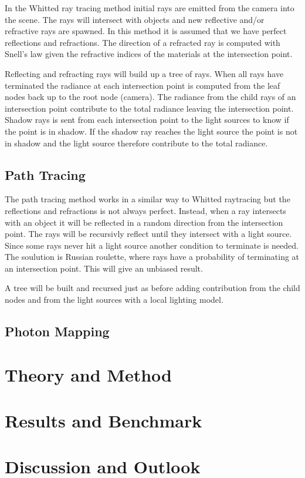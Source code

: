 \documentclass[a4paper, twocolumn]{article}
\begin{document}
    In the Whitted ray tracing method initial rays are emitted from the camera into the scene. The rays will intersect with objects and new reflective and/or refractive rays are spawned. In this method it is assumed that we have perfect reflections and refractions. The direction of a refracted ray is computed with Snell's law given the refractive indices of the materials at the intersection point.

    Reflecting and refracting rays will build up a tree of rays. When all rays have terminated the radiance at each intersection point is computed from the leaf nodes back up to the root node (camera). The radiance from the child rays of an intersection point contribute to the total radiance leaving the intersection point. Shadow rays is sent from each intersection point to the light sources to know if the point is in shadow. If the shadow ray reaches the light source the point is not in shadow and the light source therefore contribute to the total radiance. 

    \subsection{Path Tracing} \label{sec:path_tracing}

    The path tracing method works in a similar way to Whitted raytracing but the reflections and refractions is not always perfect. Instead, when a ray intersects with an object it will be reflected in a random direction from the intersection point. The rays will be recursivly reflect until they intersect with a light source. Since some rays never hit a light source another condition to terminate is needed. The soulution is Russian roulette, where rays have a probability of terminating at an intersection point. This will give an unbiased result.

    A tree will be built and recursed just as before adding contribution from the child nodes and from the light sources with a local lighting model. 
    \subsection{Photon Mapping} \label{sec:photon_mapping}

    \clearpage

    \section{Theory and Method} \label{sec:theory_and_method}

    \section{Results and Benchmark} \label{sec:results_and_benchmark}

    \section{Discussion and Outlook} \label{sec:discussion_and_outlook}

    \newpage %
    \nocite{*} %
    
    
\end{document}
